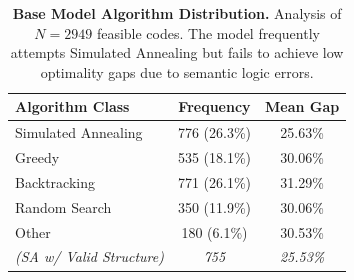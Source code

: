 \begin{table}[h]
\centering
\caption{\textbf{Base Model Algorithm Distribution.} Analysis of $N=2949$ feasible codes. The model frequently attempts Simulated Annealing but fails to achieve low optimality gaps due to semantic logic errors.}
\label{tab:base_model_algos}
\begin{tabular}{lcc}
\toprule
\textbf{Algorithm Class} & \textbf{Frequency} & \textbf{Mean Gap} \\
\midrule
Simulated Annealing & 776 (26.3\%) & 25.63\% \\
Greedy & 535 (18.1\%) & 30.06\% \\
Backtracking & 771 (26.1\%) & 31.29\% \\
Random Search & 350 (11.9\%) & 30.06\% \\
Other & 180 (6.1\%) & 30.53\% \\
\midrule
\textit{(SA w/ Valid Structure)} & \textit{755} & \textit{25.53\%} \\
\bottomrule
\end{tabular}
\end{table}